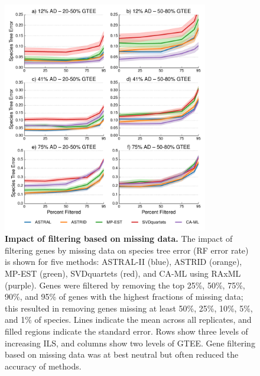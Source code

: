 \begin{figure}[!h]
\centering
\includegraphics[width=0.80\textwidth]{figures/gene-filtering-fig4.pdf}
\caption{{\bf Impact of filtering based on missing data.} The impact of filtering genes by missing data on species tree error (RF error rate) is shown for five methods: ASTRAL-II (blue), ASTRID (orange), MP-EST (green), SVDquartets (red), and CA-ML using RAxML (purple). 
Genes were filtered by removing the top 25\%, 50\%, 75\%, 90\%, and 95\% of genes with the highest fractions of missing data; this resulted in removing genes missing at least 50\%, 25\%, 10\%, 5\%, and 1\% of species. 
Lines indicate the mean across all replicates, and filled regions indicate the standard error. 
Rows show three levels of increasing ILS, and columns show two levels of GTEE. 
Gene filtering based on missing data was at best neutral but often reduced the accuracy of methods.}
\label{fig:include-4}
\end{figure}



